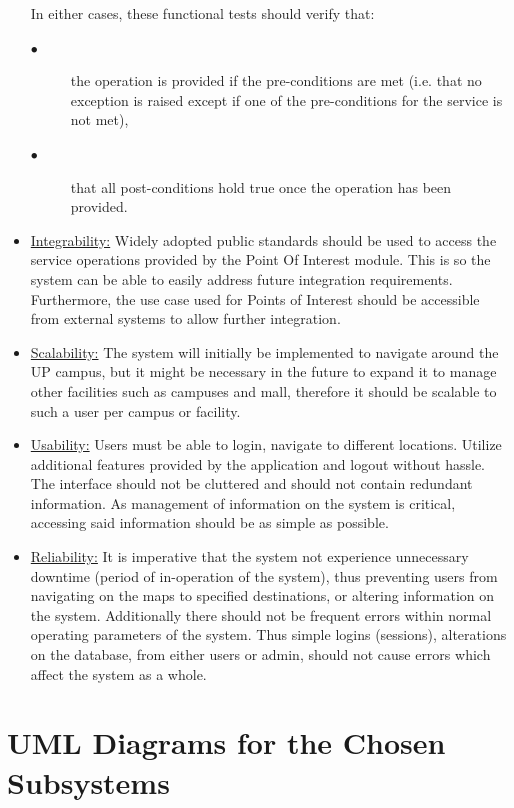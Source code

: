 \documentclass[runningheads,a4paper]{article}
\begin{document}
\begin{itemize}
In either cases, these functional tests should verify that:
\begin{description}
\item[$\bullet$] the operation is provided if the pre-conditions are met (i.e. that no exception is raised except if one of the pre-conditions for the service is not met),
\item[$\bullet$] that all post-conditions hold true once the operation has been provided.
\end{description} 

\item \underline {Integrability:} 
Widely adopted public standards should be used to access the service operations provided by the Point Of Interest module. This is so the system can be able to easily address future integration requirements. Furthermore, the use case used for Points of Interest should be accessible from external systems to allow further integration.

\item \underline {Scalability:}
The system will initially be implemented to navigate around the UP campus, but it might be necessary in the future to expand it to manage other facilities such as campuses and mall, therefore it should be scalable to such a user per campus or facility.
\item \underline {Usability:}
Users must be able to login, navigate to different locations. Utilize additional features provided by the application and logout without hassle. The interface should not be cluttered and should not contain redundant information. As management of information on the system is critical, accessing said information should be as simple as possible.
\item \underline {Reliability:} 
It is imperative that the system not experience unnecessary downtime (period of in-operation of the system), thus preventing users from navigating on the maps to specified destinations, or altering information on the system. Additionally there should not be frequent errors within normal operating parameters of the system. Thus simple logins (sessions), alterations on the database, from either users or admin, should not cause errors which affect the system as a whole.

\end{itemize}

\section{UML Diagrams for the Chosen Subsystems}
\end{document}
